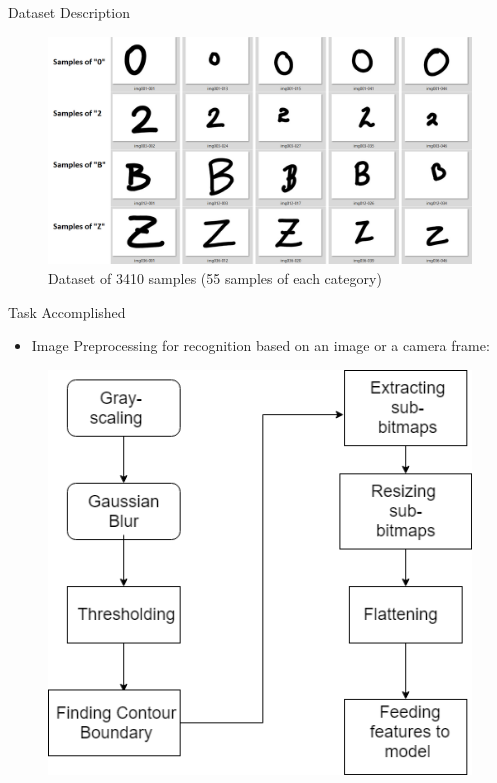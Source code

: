 \documentclass[10pt, a4paper]{beamer}
\begin{document}
\begin{frame}{Dataset Description}
  \begin{figure}
   \includegraphics[height=0.72 \textheight]{dataset.png}
   \caption{Dataset of 3410 samples (55 samples of each category)}
  \end{figure}
\end{frame}

\begin{frame}{Task Accomplished}
	\begin{itemize}
		\item Image Preprocessing for recognition based on an image or a camera frame: 
	\end{itemize}
        
    \begin{figure}
 	    \includegraphics[height=0.65 \textheight]{Image_preprocessing_Flowchart.png}
	\end{figure}

\end{frame}
\end{document}
